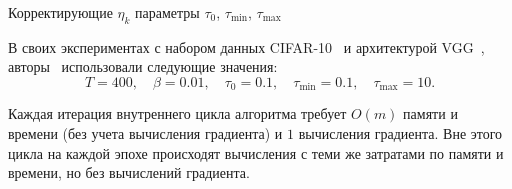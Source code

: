 \documentclass[preprint,12pt]{elsarticle}
\begin{document}
{\begin{algorithm}[H]
{        Корректирующие $\hat{\eta}_k$ параметры $\tau_0$, $\tau_{\text{min}}$, $\tau_{\text{max}}$
        }
\end{algorithm}

В своих экспериментах с набором данных CIFAR-10~\cite{CIFAR10} и архитектурой VGG~\cite{vgg}, авторы~\cite{BB-DL} использовали следующие значения:
\[
    T = 400, \quad \beta = 0.01, \quad \tau_0 = 0.1, \quad \tau_\text{min} = 0.1, \quad \tau_\text{max} = 10.
\]

Каждая итерация внутреннего цикла алгоритма требует $O(m)$ памяти и времени (без учета вычисления градиента) и $1$ вычисления градиента. 
Вне этого цикла на каждой эпохе происходят вычисления с теми же затратами по памяти и времени, но без вычислений градиента.

}
\end{document}
